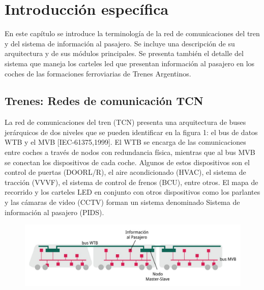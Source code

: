 \chapter{Introducción específica} %

\label{Chapter2}

En este capítulo se introduce la terminología de la red de comunicaciones del tren y del sistema de información al pasajero. Se incluye una descripción de su arquitectura y de sus módulos principales. Se presenta también el detalle del sistema que maneja los carteles led que presentan información al pasajero en los coches de las formaciones ferroviarias de Trenes Argentinos.\\



\section{Trenes: Redes de comunicación TCN}

La red de comunicaciones del tren (TCN) presenta una arquitectura de buses jerárquicos de dos niveles que se pueden identificar en la figura 1: el bus de datos WTB y el MVB [IEC-61375,1999]. El WTB se encarga de las comunicaciones entre coches a través de nodos con redundancia física, mientras que al bus MVB se conectan los dispositivos de cada coche. Algunos de estos dispositivos son el control de puertas (DOORL/R), el aire acondicionado (HVAC), el sistema de tracción (VVVF), el sistema de control de frenos (BCU), entre otros. El mapa de recorrido y los carteles LED en conjunto con otros dispositivos como los parlantes y las cámaras de video (CCTV) forman un sistema denominado Sistema de información al pasajero (PIDS).



\begin{figure}[ht]
	\centering
	\includegraphics[width=1\textwidth]{./Figures/diagramaRedTCN.png}
	\caption{}
	\label{fig:redTCN}
\end{figure}


